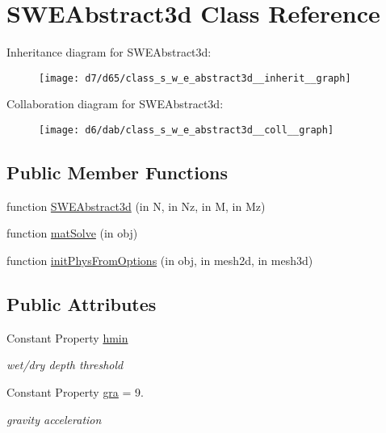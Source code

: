 \hypertarget{class_s_w_e_abstract3d}{}\section{S\+W\+E\+Abstract3d Class Reference}
\label{class_s_w_e_abstract3d}


Inheritance diagram for S\+W\+E\+Abstract3d\+:
\nopagebreak
\begin{figure}[H]
\begin{center}
\leavevmode
\texttt{[image: d7/d65/class\_s\_w\_e\_abstract3d\_\_inherit\_\_graph]}
\end{center}
\end{figure}


Collaboration diagram for S\+W\+E\+Abstract3d\+:
\nopagebreak
\begin{figure}[H]
\begin{center}
\leavevmode
\texttt{[image: d6/dab/class\_s\_w\_e\_abstract3d\_\_coll\_\_graph]}
\end{center}
\end{figure}
\subsection*{Public Member Functions}
\begin{DoxyCompactItemize}
\item 
function \hyperlink{class_s_w_e_abstract3d_a2408809742248ed269bf386808cfb311}{S\+W\+E\+Abstract3d} (in N, in Nz, in M, in Mz)
\item 
function \hyperlink{class_s_w_e_abstract3d_a81b944e443365fa0359de35c6d77285c}{mat\+Solve} (in obj)
\item 
function \hyperlink{class_s_w_e_abstract3d_ad43f9f266ab27aa467cbfd4c10c1e71d}{init\+Phys\+From\+Options} (in obj, in mesh2d, in mesh3d)
\end{DoxyCompactItemize}
\subsection*{Public Attributes}
\begin{DoxyCompactItemize}
\item 
Constant Property \hyperlink{class_s_w_e_abstract3d_a21e5bead486eb8c8534f77f1da3d567c}{hmin}
\begin{DoxyCompactList}\small\item\em wet/dry depth threshold \end{DoxyCompactList}\item 
Constant Property \hyperlink{class_s_w_e_abstract3d_a95ccfe8526956a8cd05bcd49cd9c4be3}{gra} = 9.
\begin{DoxyCompactList}\small\item\em gravity acceleration \end{DoxyCompactList}\end{DoxyCompactItemize}

